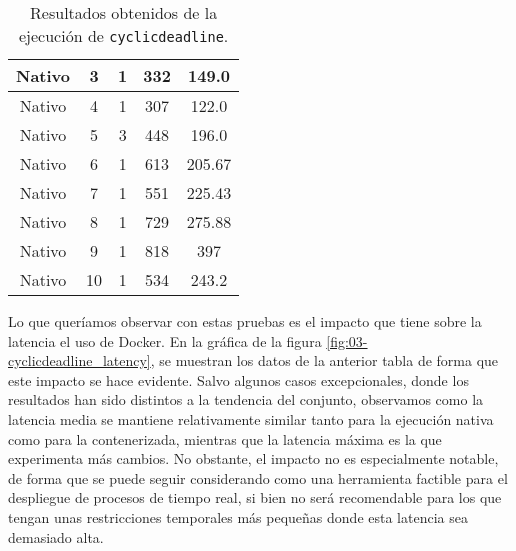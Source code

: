 \begin{table}[H]
\begin{tabular}{ | c | c | c | c | c | }
        \hline
        Nativo        & 3              & 1                         & 332                       & 149.0                    \\
        \hline
        Nativo        & 4              & 1                         & 307                       & 122.0                    \\
        \hline
        Nativo        & 5              & 3                         & 448                       & 196.0                    \\
        \hline
        Nativo        & 6              & 1                         & 613                       & 205.67                   \\
        \hline
        Nativo        & 7              & 1                         & 551                       & 225.43                   \\
        \hline
        Nativo        & 8              & 1                         & 729                       & 275.88                   \\
        \hline
        Nativo        & 9              & 1                         & 818                       & 397                      \\
        \hline
        Nativo        & 10             & 1                         & 534                       & 243.2                    \\
        \hline
    \end{tabular}
    \caption{Resultados obtenidos de la ejecución de \texttt{cyclicdeadline}.}
    \label{tab:03-cyclicdeadline_latency}
\end{table}

Lo que queríamos observar con estas pruebas es el impacto que tiene sobre la
latencia el uso de Docker. En la gráfica de la figura
\ref{fig:03-cyclicdeadline_latency}, se muestran los datos de la anterior tabla
de forma que este impacto se hace evidente.  Salvo algunos casos excepcionales,
donde los resultados han sido distintos a la tendencia del conjunto, observamos
como la latencia media se mantiene relativamente similar tanto para la ejecución
nativa como para la contenerizada, mientras que la latencia máxima es la que
experimenta más cambios. No obstante, el impacto no es especialmente notable, de
forma que se puede seguir considerando como una herramienta factible para el
despliegue de procesos de tiempo real, si bien no será recomendable para los que
tengan unas restricciones temporales más pequeñas donde esta latencia sea
demasiado alta.

